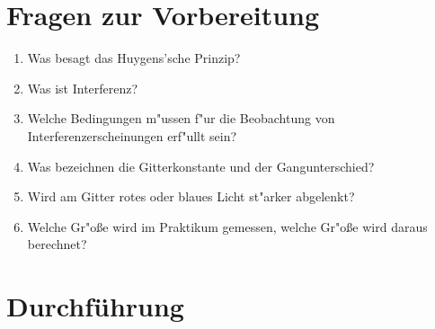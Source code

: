 \section{Fragen zur Vorbereitung}

\begin{enumerate}
 \item Was besagt das Huygens'sche Prinzip?
 \item Was ist Interferenz?
 \item Welche Bedingungen m"ussen f"ur die Beobachtung von Interferenzerscheinungen erf"ullt sein?
 \item Was bezeichnen die Gitterkonstante und der Gangunterschied?
 \item Wird am Gitter rotes oder blaues Licht st"arker abgelenkt?
 \item Welche Gr"o{\ss}e wird im Praktikum gemessen, welche Gr"o{\ss}e wird daraus berechnet?
\end{enumerate}

\section{Durchführung} 

